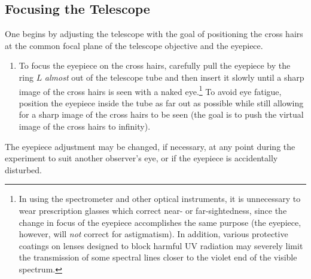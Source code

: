 \documentclass[12pt]{article}
\begin{document}
\subsection{Focusing the Telescope}
One begins by adjusting the telescope with the goal of positioning the cross hairs at the common focal plane of the telescope objective and the eyepiece.

\begin{enumerate}
    \item To focus the eyepiece on the cross hairs, carefully pull the eyepiece by the ring $L$ \textit{almost} out of the telescope tube and then insert it slowly until a sharp image of the cross hairs is seen with a naked eye.\footnote{In using the spectrometer and other optical instruments, it is unnecessary to wear prescription glasses which correct near- or far-sightedness, since the change in focus of the eyepiece accomplishes the same purpose (the eyepiece, however, will \textit{not} correct for astigmatism). In addition, various protective coatings on lenses designed to block harmful UV radiation may severely limit the transmission of some spectral lines closer to the violet end of the visible spectrum.} To avoid eye fatigue, position the eyepiece inside the tube as far out as possible while still allowing for a sharp image of the cross hairs to be seen (the goal is to push the virtual image of the cross hairs to infinity).
\end{enumerate}

The eyepiece adjustment may be changed, if necessary, at any point during the experiment to suit another observer’s eye, or if the eyepiece is accidentally disturbed.
\end{document}
